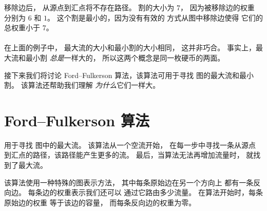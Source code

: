 移除边后，
从源点到汇点将不存在路径。
割的大小为 $7$，
因为被移除边的权重
分别为 $6$ 和 $1$。
这个割是最小的，因为没有有效的
方式从图中移除边使得
它们的总权重小于 $7$。
\\\\
在上面的例子中，
最大流的大小和最小割的大小相同，
这并非巧合。
事实上，最大流和最小割
\emph{总是}一样大的，
所以这两个概念是同一枚硬币的两面。

接下来我们将讨论 Ford–Fulkerson
算法，该算法可用于寻找
图的最大流和最小割。
该算法还帮助我们理解
\emph{为什么}它们一样大。

\section{Ford–Fulkerson 算法}


 \cite{for56} 用于寻找
图中的最大流。
该算法从一个空流开始，
在每一步中寻找一条从源点
到汇点的路径，该路径能产生更多的流。
最后，当算法无法再增加流量时，
就找到了最大流。

该算法使用一种特殊的图表示方法，
其中每条原始边在另一个方向上
都有一条反向边。
每条边的权重表示我们还可以
通过它路由多少流量。
在算法开始时，每条原始边的权重
等于该边的容量，
而每条反向边的权重为零。

